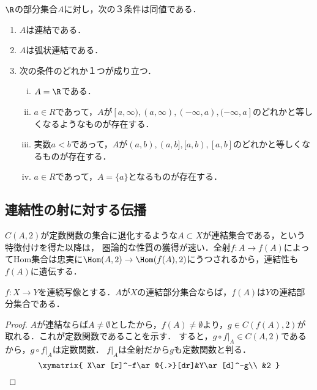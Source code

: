 \documentclass[uplatex,dvipdfmx]{jsreport}
\begin{document}
\begin{proposition}[$\R$の連結集合の分類]
    $\R$の部分集合$A$に対し，次の３条件は同値である．
    \begin{enumerate}
        \item $A$は連結である．
        \item $A$は弧状連結である．
        \item 次の条件のどれか１つが成り立つ．
        \begin{enumerate}[(i)]
            \item $A=\R$である．
            \item $a\in R$であって，$A$が$[a,\infty),(a,\infty),(-\infty,a),(-\infty,a]$のどれかと等しくなるようなものが存在する．
            \item 実数$a<b$であって，$A$が$(a,b),(a,b],[a,b),[a,b]$のどれかと等しくなるものが存在する．
            \item $a\in R$であって，$A=\{a\}$となるものが存在する．
        \end{enumerate}
    \end{enumerate}
\end{proposition}

\subsection{連結性の射に対する伝播}

\begin{tcolorbox}[colframe=ForestGreen, colback=ForestGreen!10!white, breakable ,colbacktitle=ForestGreen!40!white, coltitle=black,fonttitle=\bfseries\sffamily
    ,title=連結性と射]
    $C(A,2)$が定数関数の集合に退化するような$A\subset X$が連結集合である，という特徴付けを得た以降は，
    圏論的な性質の獲得が速い．全射$f:A\to f(A)$によってHom集合は忠実に$\Hom(A,2)\to\Hom(f(A),2)$にうつされるから，連結性も$f(A)$に遺伝する．
\end{tcolorbox}

\begin{proposition}[連続写像は連結性を保存する]\label{prop-connectedness-over-morphism}
    $f:X\to Y$を連続写像とする．$A$が$X$の連結部分集合ならば，$f(A)$は$Y$の連結部分集合である．
\end{proposition}
\begin{proof}
    $A$が連結ならば$A\ne\emptyset$としたから，$f(A)\ne\emptyset$より，$g\in C(f(A),2)$が取れる．これが定数関数であることを示す．
    すると，$g\circ f|_A\in C(A,2)$であるから，$g\circ f|_A$は定数関数．
    $f|_A$は全射だから$g$も定数関数と判る．
    \[\xymatrix{
        X\ar[r]^-f\ar@{.>}[dr]&Y\ar[d]^-g\\
        &2
    }\]
\end{proof}
\end{document}
